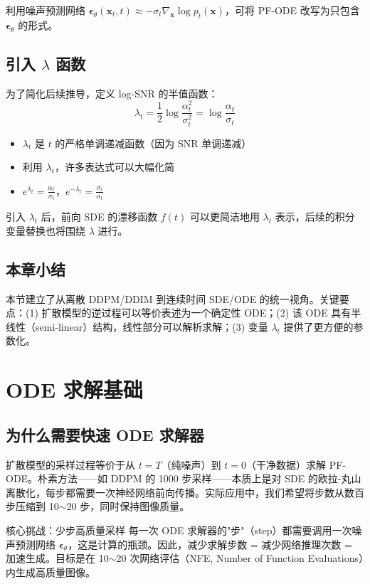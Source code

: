 \documentclass[a4paper]{article}
\begin{document}
利用噪声预测网络 $\boldsymbol{\epsilon}_\theta(\mathbf{x}_t, t) \approx -\sigma_t \nabla_{\mathbf{x}} \log p_t(\mathbf{x})$，可将 PF-ODE 改写为只包含 $\boldsymbol{\epsilon}_\theta$ 的形式。

\subsection{引入 $\lambda$ 函数}

为了简化后续推导，定义 log-SNR 的半值函数：
$$\lambda_t = \frac{1}{2} \log \frac{\alpha_t^2}{\sigma_t^2} = \log \frac{\alpha_t}{\sigma_t}$$

\begin{itemize}
    \item $\lambda_t$ 是 $t$ 的严格单调递减函数（因为 SNR 单调递减）
    \item 利用 $\lambda_t$，许多表达式可以大幅化简
    \item $e^{\lambda_t} = \frac{\alpha_t}{\sigma_t}$，$e^{-\lambda_t} = \frac{\sigma_t}{\alpha_t}$
\end{itemize}

引入 $\lambda_t$ 后，前向 SDE 的漂移函数 $f(t)$ 可以更简洁地用 $\lambda_t$ 表示，后续的积分变量替换也将围绕 $\lambda$ 进行。

\subsection{本章小结}

本节建立了从离散 DDPM/DDIM 到连续时间 SDE/ODE 的统一视角。关键要点：(1) 扩散模型的逆过程可以等价表述为一个确定性 ODE；(2) 该 ODE 具有半线性（semi-linear）结构，线性部分可以解析求解；(3) 变量 $\lambda_t$ 提供了更方便的参数化。


\section{ODE 求解基础}

\subsection{为什么需要快速 ODE 求解器}

扩散模型的采样过程等价于从 $t=T$（纯噪声）到 $t=0$（干净数据）求解 PF-ODE。朴素方法——如 DDPM 的 1000 步采样——本质上是对 SDE 的欧拉-丸山离散化，每步都需要一次神经网络前向传播。实际应用中，我们希望将步数从数百步压缩到 10$\sim$20 步，同时保持图像质量。

\begin{importantbox}{核心挑战：少步高质量采样}
每一次 ODE 求解器的"步"（step）都需要调用一次噪声预测网络 $\boldsymbol{\epsilon}_\theta$，这是计算的瓶颈。因此，减少求解步数 = 减少网络推理次数 = 加速生成。目标是在 10$\sim$20 次网络评估（NFE, Number of Function Evaluations）内生成高质量图像。
\end{importantbox}
\end{document}
